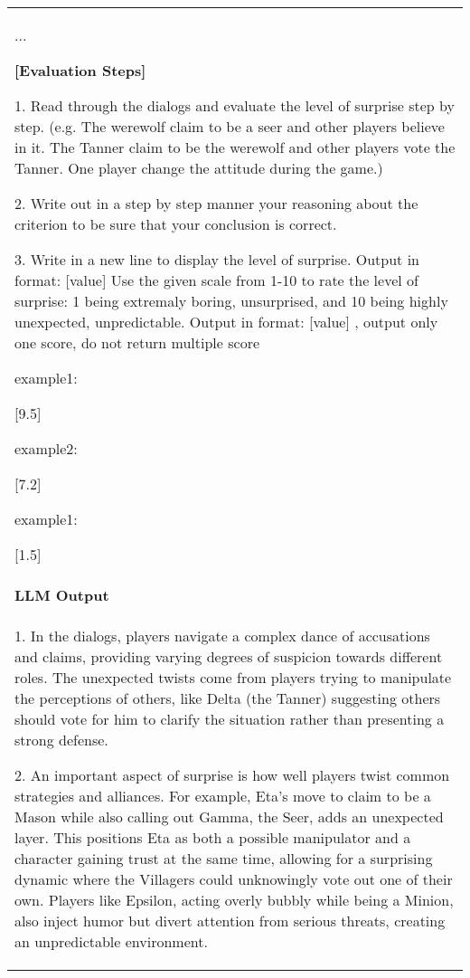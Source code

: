 \begin{table*}[ht]
{\begin{tabular}{p{16cm}}
{    ...

    \textbf{[Evaluation Steps]}

    1. Read through the dialogs and evaluate the level of surprise step by step. (e.g. The werewolf claim to be a seer and other players believe in it. The Tanner claim to be the werewolf and other players vote the Tanner. One player change the attitude during the game.) 

    2. Write out in a step by step manner your reasoning about the criterion to be sure that your conclusion is correct.
    
    3. Write in a new line to display the level of surprise. Output in format: [value] Use the given scale from 1-10 to rate the level of surprise: 1 being extremaly boring, unsurprised, and 10 being highly unexpected, unpredictable.
     Output in format: [value] , output only one score, do not return multiple score  

    example1:

    [9.5]

    example2:

    [7.2]

    example1:

    [1.5]

    }
    \\ 

    \rowcolor[gray]{0.95} \vspace*{-8pt} {\fontsize{10pt}{12pt}\selectfont \bf LLM Output } \vspace*{2pt} \\

    {\ttfamily\small
    1. In the dialogs, players navigate a complex dance of accusations and claims, providing varying degrees of suspicion towards different roles. The unexpected twists come from players trying to manipulate the perceptions of others, like Delta (the Tanner) suggesting others should vote for him to clarify the situation rather than presenting a strong defense.

    2. An important aspect of surprise is how well players twist common strategies and alliances. For example, Eta's move to claim to be a Mason while also calling out Gamma, the Seer, adds an unexpected layer. This positions Eta as both a possible manipulator and a character gaining trust at the same time, allowing for a surprising dynamic where the Villagers could unknowingly vote out one of their own. Players like Epsilon, acting overly bubbly while being a Minion, also inject humor but divert attention from serious threats, creating an unpredictable environment. 
    
}
\end{tabular}}
\end{table*}
